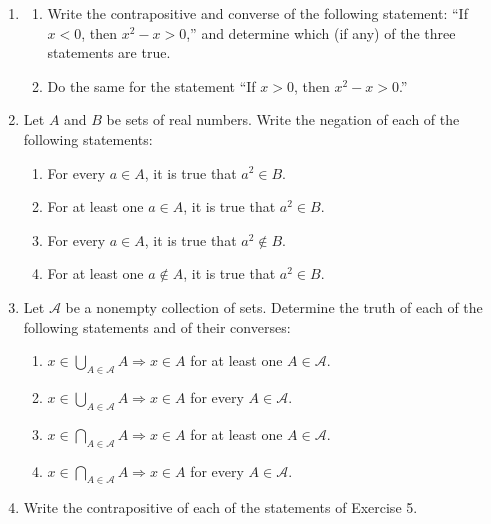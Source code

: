 \begin{enumerate}[itemsep=0.4em, parsep=0pt, topsep=0pt, partopsep=0pt, leftmargin=*, label=\arabic*., ref=\arabic*]
\item
  \begin{enumerate}[itemsep=0.2em, parsep=0pt, topsep=0pt, partopsep=0pt, leftmargin=*, label=(\alph*), align=left]
  \item Write the contrapositive and converse of the following statement: ``If \(x < 0\), then \(x^{2} - x > 0\),'' and determine which (if any) of the three statements are true.
  \item Do the same for the statement ``If \(x > 0\), then \(x^{2} - x > 0\).''
  \end{enumerate}

\item Let \(A\) and \(B\) be sets of real numbers. Write the negation of each of the following statements:
  \begin{enumerate}[itemsep=0.2em, parsep=0pt, topsep=0pt, partopsep=0pt, leftmargin=*, label=(\alph*), align=left]
  \item For every \(a \in A\), it is true that \(a^{2} \in B\).
  \item For at least one \(a \in A\), it is true that \(a^{2} \in B\).
  \item For every \(a \in A\), it is true that \(a^{2} \notin B\).
  \item For at least one \(a \notin A\), it is true that \(a^{2} \in B\).
  \end{enumerate}

\item Let \(\mathcal{A}\) be a nonempty collection of sets. Determine the truth of each of the following statements and of their converses:
  \begin{enumerate}[itemsep=0.2em, parsep=0pt, topsep=0pt, partopsep=0pt, leftmargin=*, label=(\alph*), align=left]
  \item \(x \in \mathop{\bigcup }\limits_{{A \in \mathcal{A}}}A \Rightarrow x \in A\) for at least one \(A \in \mathcal{A}\).
  \item \(x \in \mathop{\bigcup }\limits_{{A \in \mathcal{A}}}A \Rightarrow x \in A\) for every \(A \in \mathcal{A}\).
  \item \(x \in \mathop{\bigcap }\limits_{{A \in \mathcal{A}}}A \Rightarrow x \in A\) for at least one \(A \in \mathcal{A}\).
  \item \(x \in \mathop{\bigcap }\limits_{{A \in \mathcal{A}}}A \Rightarrow x \in A\) for every \(A \in \mathcal{A}\).
  \end{enumerate}
\item Write the contrapositive of each of the statements of Exercise 5.


\end{enumerate}
